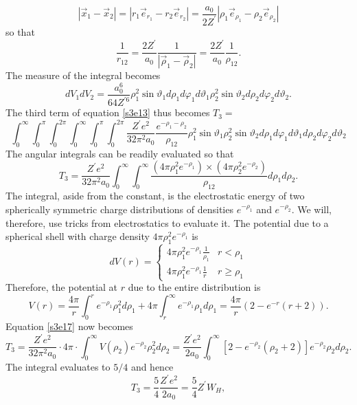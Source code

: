 \documentclass{article}
\numberwithin{equation}{section}
\begin{document}
\[
|\vec{x}_1 - \vec{x}_2| = |r_1 \vec{e}_{r_1} - r_2 \vec{e}_{r_2}| = \frac{a_0}{2Z^\prime}|\rho_1\vec{e}_{\rho_1} - \rho_2\vec{e}_{\rho_2}|
\]
so that
\begin{equation}\label{s3e14}
\frac{1}{r_{12}} = \frac{2Z^\prime}{a_0}\frac{1}{|\vec{\rho}_1 - \vec{\rho}_2|} = \frac{2Z^\prime}{a_0}\frac{1}{\rho_{12}}.
\end{equation}
The measure of the integral becomes
\begin{equation}\label{s3e15}
dV_1 dV_2 = \frac{a_0^6}{64 Z^{\prime 6}}\rho_1^2\sin\vartheta_1d\rho_1 d\varphi_1 d\vartheta_1\rho_2^2\sin\vartheta_2d\rho_2 d\varphi_2 d\vartheta_2.
\end{equation}
The third term of equation \eqref{s3e13} thus becomes $T_3 = $
\begin{equation}\label{s3e16}
\int_0^\infty\int_0^\pi\int_0^{2\pi}\int_0^\infty\int_0^\pi\int_0^{2\pi}\frac{Z^\prime e^2}{32\pi^2 a_0}\frac{e^{-\rho_1 - \rho_2}}{\rho_{12}}\rho_1^2\sin\vartheta_1\rho_2^2\sin\vartheta_2 
d\rho_1d\varphi_1d\vartheta_1 d\rho_2d\varphi_2d\vartheta_2
\end{equation}
The angular integrals can be readily evaluated so that
\begin{equation}\label{s3e17}
T_3 = \frac{Z^\prime e^2}{32\pi^2 a_0}\int_0^\infty\int_0^\infty \frac{(4\pi\rho_1^2e^{-\rho_1}) \times (4\pi\rho_2^2e^{-\rho_2})}{\rho_{12}}d\rho_1 d\rho_2.
\end{equation}
The integral, aside from the constant, is the electrostatic energy of two
spherically symmetric charge distributions of densities $e^{-\rho_1}$ and
$e^{-\rho_2}$. We will, therefore, use tricks from electrostatics to evaluate
it. The potential due to a spherical shell with charge density $4\pi\rho_1^2e^{-\rho_1}$
is
\[
dV(r) = \begin{cases}
4\pi\rho_1^2e^{-\rho_1}\frac{1}{\rho_1} & r < \rho_1 \\
4\pi\rho_1^2e^{-\rho_1}\frac{1}{r}      & r \ge \rho_1
\end{cases}
\]
Therefore, the potential at $r$ due to the entire distribution is
\[
V(r) = \frac{4\pi}{r}\int_0^re^{-\rho_1}\rho_1^2d\rho_1 + 4\pi\int_r^\infty e^{-\rho_1}\rho_1d\rho_1 = \frac{4\pi}{r}(2 - e^{-r}(r + 2)).
\]
Equation \eqref{s3e17} now becomes
\[
T_3 = \frac{Z^\prime e^2}{32\pi^2 a_0}\cdot 4\pi\cdot\int_0^\infty V(\rho_2)e^{-\rho_2}\rho_2^2d\rho_2
 = \frac{Z^\prime e^2}{2a_0}\int_0^\infty [2 - e^{-\rho_2}(\rho_2 +2)]e^{-\rho_2}\rho_2d\rho_2.
\]
The integral evaluates to $5/4$ and hence
\begin{equation}\label{s3e18}
T_3 = \frac{5}{4}\frac{Z^\prime e^2}{2a_0} = \frac{5}{4}Z^\prime W_H,
\end{equation}
\end{document}

